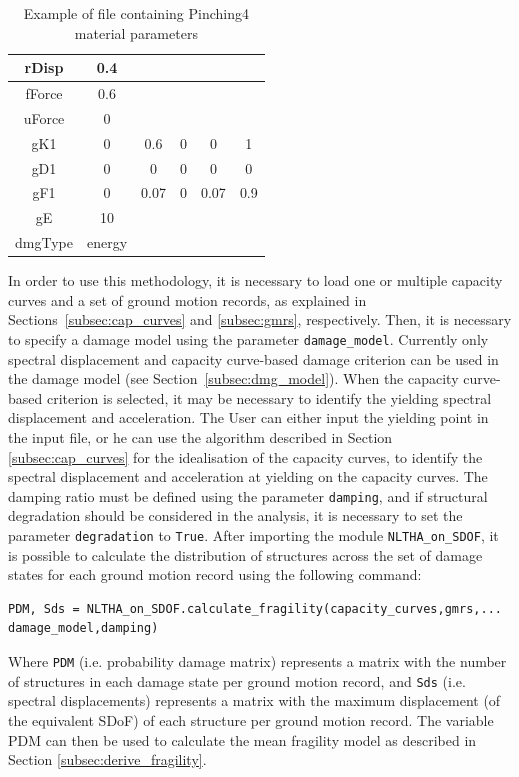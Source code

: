 \begin {table}[htb]
\caption{Example of file containing Pinching4 material parameters}
\label{table:pinching4}
\begin{center}
  \begin{tabular}{ | c | c | c | c | c | c |}
  \hline
	rDisp  & 0.4	&	&	&	 &	\\ \hline
	fForce	 & 0.6 &	&	&	 &	\\ \hline
	uForce	 & 0	&	&	&	 &	\\ \hline
	gK1	 & 0  &	0.6  &	0  &	0	 & 1\\ \hline
	gD1	 & 0	 & 0  &	0  &	0  &	0\\ \hline
	gF1	 & 0  &	0.07	 & 0  &	0.07  &	0.9\\ \hline
	gE	 & 10 &	&	&	 &\\ \hline
	dmgType	& energy &	&	&	 &\\ \hline
	\end{tabular}
\end{center}
\end{table}			

In order to use this methodology, it is necessary to load one or multiple capacity curves and a set of ground motion records, as explained in Sections~\ref{subsec:cap_curves} and \ref{subsec:gmrs}, respectively. Then, it is necessary to specify a damage model using the parameter \verb=damage_model=. Currently only spectral displacement and capacity curve-based  damage criterion can be used in the damage model (see Section~\ref{subsec:dmg_model}). When the capacity curve-based criterion is selected, it may be necessary to identify the yielding spectral displacement and acceleration. The User can either input the yielding point in the input file, or he can use the algorithm described in Section \ref{subsec:cap_curves} for the idealisation of the capacity curves, to identify the spectral displacement and acceleration at yielding on the capacity curves.
The damping ratio must be defined using the parameter \verb=damping=, and if structural degradation should be considered in the analysis, it is necessary to set the parameter \verb=degradation= to \verb=True=. After importing the module \verb=NLTHA_on_SDOF=, it is possible to calculate the distribution of structures across the set of damage states for each ground motion record using the following command:

\begin{Verbatim}[frame=single, commandchars=\\\{\}, samepage=true]
PDM, Sds = NLTHA_on_SDOF.calculate_fragility(capacity_curves,gmrs,...
damage_model,damping)
\end{Verbatim}

Where \verb=PDM= (i.e. probability damage matrix) represents a matrix with the number of structures in each damage state per ground motion record, and \verb=Sds= (i.e. spectral displacements) represents a matrix with the maximum displacement (of the equivalent SDoF) of each structure per ground motion record. The variable PDM can then be used to calculate the mean fragility model as described in Section \ref{subsec:derive_fragility}.